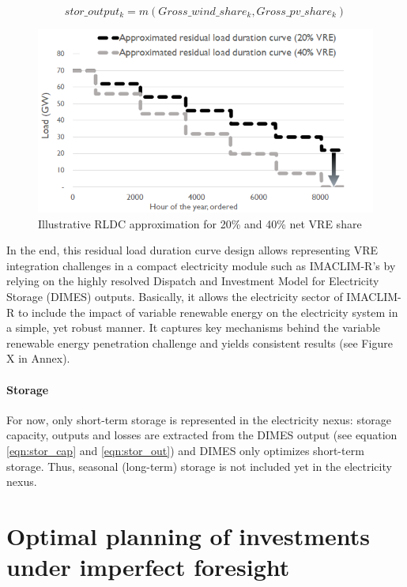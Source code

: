 \begin{dmath}
    {stor\_output_{k}} = m(Gross\_wind\_share_{k},Gross\_pv\_share_{k})
    \label{eqn:stor_out}
\end{dmath}




\begin{figure}[H]
    \includegraphics[scale=0.8]{figures&tables/LDC&RLDC.png}
    \centering
    \caption{Illustrative RLDC approximation for 20\% and 40\% net VRE share}
    \label{fig:RLDCapprox}
\end{figure}

In the end, this residual load duration curve design allows representing VRE integration challenges in a compact electricity module such as IMACLIM-R's by relying on the highly resolved Dispatch and Investment Model for Electricity Storage (DIMES)  outputs. Basically, it allows the electricity sector of IMACLIM-R to include the impact of variable renewable energy on the electricity system in a simple, yet robust manner. It captures key mechanisms behind the variable renewable energy penetration challenge and yields consistent results (see Figure X in Annex).

\paragraph*{Storage}
For now, only short-term storage is represented in the electricity nexus: storage capacity, outputs and losses are extracted from the DIMES output (see equation \ref{eqn:stor_cap} and \ref{eqn:stor_out}) and DIMES only optimizes short-term storage. Thus, seasonal (long-term) storage is not included yet in the electricity nexus.

\section{Optimal planning of investments under imperfect foresight}

